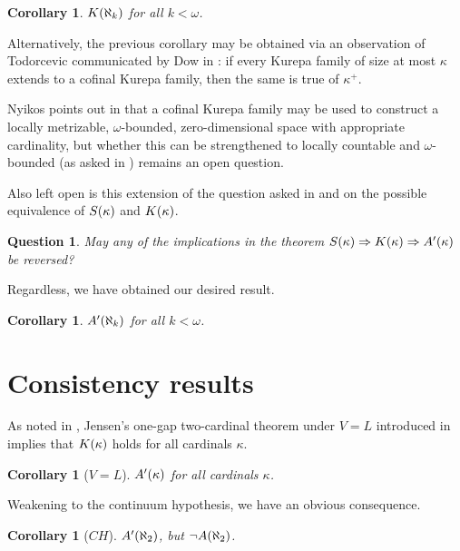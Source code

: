 \documentclass{amsart}
\theoremstyle{plain}
\newtheorem{corollary}[theorem]{Corollary}
\newtheorem{question}[theorem]{Question}
\theoremstyle{definition}
\theoremstyle{remark}
\theoremstyle{plain}
\theoremstyle{definition}
\theoremstyle{remark}
\begin{document}
  \begin{corollary}
    \(K(\aleph_k)\) for all \(k<\omega\).
  \end{corollary}

  Alternatively, the previous corollary may be obtained
  via an observation of Todorcevic
  communicated by Dow in \cite{MR1229125}:
  if every Kurepa family of size at most \(\kappa\)
  extends to a cofinal Kurepa family, then the same is true of \(\kappa^+\).

  Nyikos points out in \cite{NYIKOSKUREPA} that a cofinal Kurepa family may
  be used to construct a locally metrizable, \(\omega\)-bounded,
  zero-dimensional space with appropriate cardinality,
  but whether this can be
  strengthened to locally countable and \(\omega\)-bounded (as asked in
  \cite{MR539228}) remains an open question.

  Also left open is this extension of the question asked in \cite{NYIKOSKUREPA}
  and \cite{MR539228} on the possible equivalence of \(S(\kappa)\)
  and \(K(\kappa)\).

  \begin{question}
    May any of the implications in the theorem
    \(S(\kappa)\Rightarrow K(\kappa)\Rightarrow A'(\kappa)\)
    be reversed?
  \end{question}

  Regardless, we have obtained our desired result.

  \begin{corollary}
    \(A'(\aleph_k)\) for all \(k<\omega\).
  \end{corollary}




  \section{Consistency results}

  As noted in \cite{MR1229125}, Jensen's one-gap two-cardinal theorem under
  \(V=L\) introduced in \cite{MR0309729} implies that \(K(\kappa)\)
  holds for all cardinals \(\kappa\).

  \begin{corollary}[\(V=L\)]
    \(A'(\kappa)\) for all cardinals \(\kappa\).
  \end{corollary}

  Weakening to the continuum hypothesis, we have an obvious consequence.

  \begin{corollary}[\(CH\)]
    \(A'(\aleph_2)\), but \(\neg A(\aleph_2)\).
  \end{corollary}
\end{document}

